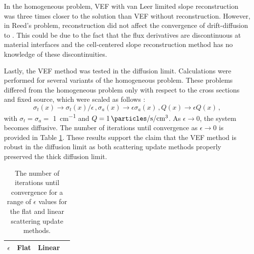 In the homogeneous problem, VEF with van Leer limited slope reconstruction was three times closer to the \SN solution than VEF without reconstruction. However, in Reed's problem, reconstruction did not affect the convergence of drift-diffusion to \SN. This could be due to the fact that the flux derivatives are discontinuous at material interfaces and the cell-centered slope reconstruction method has no knowledge of these discontinuities. 

Lastly, the VEF method was tested in the diffusion limit. Calculations were performed for several variants of the homogeneous problem. 
These problems differed from the homogeneous problem only with respect to the cross sections and fixed source, which were scaled as follows \cite{diflim}: 
	\begin{subequations} \label{res:scaling}
		\begin{equation} 
			\sigma_t(x) \rightarrow \sigma_t(x)/\epsilon \,, 
		\end{equation}
		\begin{equation}
			\sigma_a(x) \rightarrow \epsilon \sigma_a(x) \,,
		\end{equation}
		\begin{equation}
			Q(x) \rightarrow \epsilon Q(x) \,, 
		\end{equation}
	\end{subequations}
with $\sigma_t=\sigma_a=$ \SI{1}{cm^{-1}} and $Q = \SI{1}{\particles\per\second\per\cm\cubed}$.  As $\epsilon \rightarrow 0$, the system becomes diffusive. The number of iterations until convergence as $\epsilon \rightarrow 0$ is provided in Table \ref{tab:diffLim}. 
These results support the claim that the VEF method is robust in the diffusion limit as both scattering update methods properly preserved the thick diffusion limit. 
	\begin{table}[htb]
	\centering
	\begin{tabular}{|c|c|c|c|}
	\hline
	\hline
	$\epsilon$ & Flat & Linear \\ 
	\hline
		
	\hline
	\hline
	\end{tabular}
	\caption{The number of iterations until convergence for a range of $\epsilon$ values for the flat and linear scattering update methods. }
	\label{tab:diffLim}
	\end{table}
	
